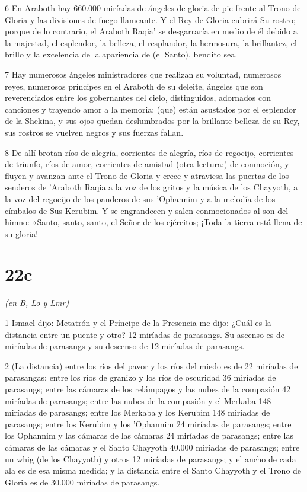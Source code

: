 \par 6 En Araboth hay 660.000 miríadas de ángeles de gloria de pie frente al Trono de Gloria y las divisiones de fuego llameante. Y el Rey de Gloria cubrirá Su rostro; porque de lo contrario, el Araboth Raqia' se desgarraría en medio de él debido a la majestad, el esplendor, la belleza, el resplandor, la hermosura, la brillantez, el brillo y la excelencia de la apariencia de (el Santo), bendito sea.

\par 7 Hay numerosos ángeles ministradores que realizan su voluntad, numerosos reyes, numerosos príncipes en el Araboth de su deleite, ángeles que son reverenciados entre los gobernantes del cielo, distinguidos, adornados con canciones y trayendo amor a la memoria: (que) están asustados por el esplendor de la Shekina, y sus ojos quedan deslumbrados por la brillante belleza de su Rey, sus rostros se vuelven negros y sus fuerzas fallan.

\par 8 De allí brotan ríos de alegría, corrientes de alegría, ríos de regocijo, corrientes de triunfo, ríos de amor, corrientes de amistad (otra lectura:) de conmoción, y fluyen y avanzan ante el Trono de Gloria y crece y atraviesa las puertas de los senderos de 'Araboth Raqia a la voz de los gritos y la música de los Chayyoth, a la voz del regocijo de los panderos de sus 'Ophannim y a la melodía de los címbalos de Sus Kerubim. Y se engrandecen y salen conmocionados al son del himno: «Santo, santo, santo, el Señor de los ejércitos; ¡Toda la tierra está llena de su gloria!

\chapter{22c}

\par \textit{(en B, Lo y Lmr)}

\par 1 Ismael dijo: Metatrón y el Príncipe de la Presencia me dijo: ¿Cuál es la distancia entre un puente y otro? 12 miríadas de parasangs. Su ascenso es de miríadas de parasangs y su descenso de 12 miríadas de parasangs.

\par 2 (La distancia) entre los ríos del pavor y los ríos del miedo es de 22 miríadas de parasangas; entre los ríos de granizo y los ríos de oscuridad 36 miríadas de parasangs; entre las cámaras de los relámpagos y las nubes de la compasión 42 miríadas de parasangs; entre las nubes de la compasión y el Merkaba 148 miríadas de parasangs; entre los Merkaba y los Kerubim 148 miríadas de parasangs; entre los Kerubim y los 'Ophannim 24 miríadas de parasangs; entre los Ophannim y las cámaras de las cámaras 24 miríadas de parasangs; entre las cámaras de las cámaras y el Santo Chayyoth 40.000 miríadas de parasangs; entre un whig (de los Chayyoth) y otros 12 miríadas de parasangs; y el ancho de cada ala es de esa misma medida; y la distancia entre el Santo Chayyoth y el Trono de Gloria es de 30.000 miríadas de parasangs.

